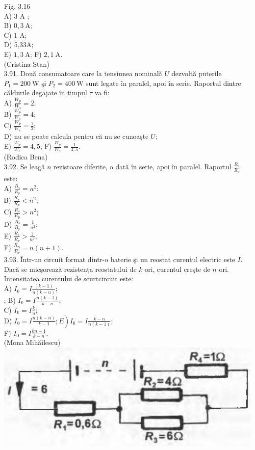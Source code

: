 \documentclass[10pt]{article}
\begin{document}
Fig. 3.16\\
A) 3 A ;\\
B) $0,3 \mathrm{~A}$;\\
C) 1 A;\\
D) 5,33A;\\
E) $1,3 \mathrm{~A}$; F) $2,1 \mathrm{~A}$.\\
(Cristina Stan)\\
3.91. Două consumatoare care la tensiunea nominalǎ $U$ dezvoltă puterile $P_{1}=200 \mathrm{~W}$ şi $P_{2}=400 \mathrm{~W}$ sunt legate în paralel, apoi în serie. Raportul dintre căldurile degajate în timpul $\tau$ va fi:\\
A) $\frac{W_{p}}{W_{s}}=2$;\\
B) $\frac{W_{p}}{W_{s}}=4$;\\
C) $\frac{W_{p}}{W_{s}}=\frac{1}{2}$;\\
D) nu se poate calcula pentru că nu se cunoaşte $U$;\\
E) $\frac{W_{p}}{W_{s}}=4,5$; F) $\frac{W_{p}}{W_{s}}=\frac{1}{4,5}$.\\
(Rodica Bena)\\
3.92. Se leagă $n$ rezistoare diferite, o dată în serie, apoi în paralel. Raportul $\frac{R_{s}}{R_{p}}$ este:\\
A) $\frac{R_{s}}{R_{p}}=n^{2}$;\\
В) $\frac{R_{s}}{R_{p}}<n^{2}$;\\
C) $\frac{R_{s}}{R_{p}}>n^{2}$;\\
D) $\frac{R_{s}}{R_{p}}=\frac{1}{n^{2}}$;\\
E) $\frac{R_{s}}{R_{p}}>\frac{1}{n^{2}}$;\\
F) $\frac{R_{S}}{R_{p}}=n(n+1)$.\\
3.93. Într-un circuit format dintr-o baterie şi un reostat curentul electric este $I$. Dacă se micşorează rezistența reostatului de $k$ ori, curentul creşte de $n$ ori. Intensitatea curentului de scurtcircuit este:\\
A) $I_{0}=I \frac{(k-1)}{n(k-n)}$;\\
; B) $I_{0}=I \frac{n(k-1)}{k-n}$;\\
C) $I_{0}=I \frac{k}{n}$;\\
D) $\left.I_{0}=I \frac{n(k-n)}{k-1} ; E\right) I_{0}=I \frac{k-n}{n(k-1)}$;\\
F) $I_{0}=I \frac{k n-1}{k-n}$.\\
(Mona Mihăilescu)\\
\includegraphics[max width=\textwidth, center]{2025_07_01_5b3ff9fa0d508c8e9f17g-164}
\end{document}
